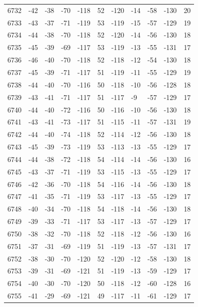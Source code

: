 \begin{table}[H]
\begin{tabular}{lllllllllll}
6732 & -42 & -38 & -70 & -118 & 52 & -120 & -14 & -58 & -130 & 20 \\
6733 & -43 & -37 & -71 & -119 & 53 & -119 & -15 & -57 & -129 & 19 \\
6734 & -44 & -38 & -70 & -118 & 52 & -120 & -14 & -56 & -130 & 18 \\
6735 & -45 & -39 & -69 & -117 & 53 & -119 & -13 & -55 & -131 & 17 \\
6736 & -46 & -40 & -70 & -118 & 52 & -118 & -12 & -54 & -130 & 18 \\
6737 & -45 & -39 & -71 & -117 & 51 & -119 & -11 & -55 & -129 & 19 \\
6738 & -44 & -40 & -70 & -116 & 50 & -118 & -10 & -56 & -128 & 18 \\
6739 & -43 & -41 & -71 & -117 & 51 & -117 & -9 & -57 & -129 & 17 \\
6740 & -44 & -40 & -72 & -116 & 50 & -116 & -10 & -56 & -130 & 18 \\
6741 & -43 & -41 & -73 & -117 & 51 & -115 & -11 & -57 & -131 & 19 \\
6742 & -44 & -40 & -74 & -118 & 52 & -114 & -12 & -56 & -130 & 18 \\
6743 & -45 & -39 & -73 & -119 & 53 & -113 & -13 & -55 & -129 & 17 \\
6744 & -44 & -38 & -72 & -118 & 54 & -114 & -14 & -56 & -130 & 16 \\
6745 & -43 & -37 & -71 & -119 & 53 & -115 & -13 & -55 & -129 & 17 \\
6746 & -42 & -36 & -70 & -118 & 54 & -116 & -14 & -56 & -130 & 18 \\
6747 & -41 & -35 & -71 & -119 & 53 & -117 & -13 & -55 & -129 & 17 \\
6748 & -40 & -34 & -70 & -118 & 54 & -118 & -14 & -56 & -130 & 18 \\
6749 & -39 & -33 & -71 & -117 & 53 & -117 & -13 & -57 & -129 & 17 \\
6750 & -38 & -32 & -70 & -118 & 52 & -118 & -12 & -56 & -130 & 16 \\
6751 & -37 & -31 & -69 & -119 & 51 & -119 & -13 & -57 & -131 & 17 \\
6752 & -38 & -30 & -70 & -120 & 52 & -120 & -12 & -58 & -130 & 18 \\
6753 & -39 & -31 & -69 & -121 & 51 & -119 & -13 & -59 & -129 & 17 \\
6754 & -40 & -30 & -70 & -120 & 50 & -118 & -12 & -60 & -128 & 16 \\
6755 & -41 & -29 & -69 & -121 & 49 & -117 & -11 & -61 & -129 & 17 \\

\end{tabular}
\end{table}
